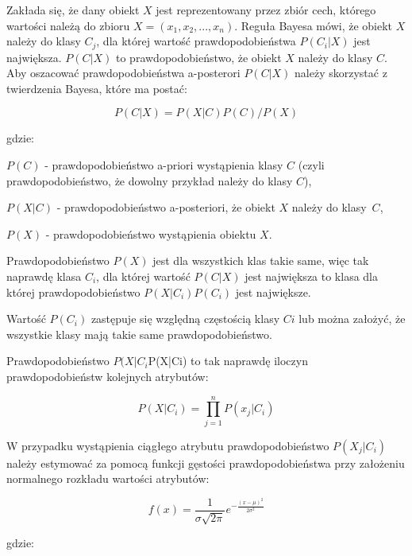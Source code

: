 \documentclass[[10pt,a4paper]{article}
\begin{document}
\vspace{0.5cm}
Zakłada się, że dany obiekt $X$ jest reprezentowany przez zbiór cech, którego wartości należą do zbioru $X=(x_{1}, x_{2}, ..., x_{n})$. Reguła Bayesa mówi, że obiekt $X$ należy do klasy $C_{j}$, dla której wartość prawdopodobieństwa $P(C_{i}|X)$ jest największa. $P(C|X)$ to prawdopodobieństwo, że obiekt $X$ należy do klasy $C$. Aby oszacować prawdopodobieństwa a-posterori $P(C|X)$ należy skorzystać z twierdzenia Bayesa, które ma postać:

\begin{equation}
P(C|X) = P(X|C)P(C)/P(X)
\end{equation}

gdzie:

$P(C)$ - prawdopodobieństwo a-priori wystąpienia klasy $C$ (czyli prawdopodobieństwo, że dowolny przykład należy do klasy $C$),

$P(X|C)$ - prawdopodobieństwo a-posteriori, że obiekt $X$ należy do klasy~$C$,

$P(X)$ - prawdopodobieństwo wystąpienia obiektu $X$.

\vspace{0.5cm}
Prawdopodobieństwo $P(X)$ jest dla wszystkich klas takie same, więc tak naprawdę klasa $C_{i}$, dla której wartość $P(C|X)$ jest największa to klasa dla której prawdopodobieństwo $P(X|C_{i})P(C_{i})$ jest największe. 

\vspace{0.5cm}
Wartość $P(C_{i})$ zastępuje się względną częstością klasy $C{i}$ lub można założyć, że wszystkie klasy mają takie same prawdopodobieństwo.
 
 \vspace{0.5cm}
Prawdopodobieństwo $P(X|C_{i}$P(X|Ci) to tak naprawdę iloczyn prawdopodobieństw kolejnych atrybutów:

\begin{equation}
P(X|C_{i}) = \prod_{j=1}^{n}P(x_{j}|C_{i})
\end{equation}

W przypadku wystąpienia ciągłego atrybutu prawdopodobieństwo $P(X_{j}|C_{i})$ należy estymować za pomocą funkcji gęstości prawdopodobieństwa przy założeniu normalnego rozkładu wartości atrybutów:


\begin{equation}
f(x) = \frac{1}{\sigma \sqrt{2\pi}}e^{-\frac{(x - \mu)^{2}}{2\sigma^{2}}}
\end{equation}

gdzie:
\end{document}
